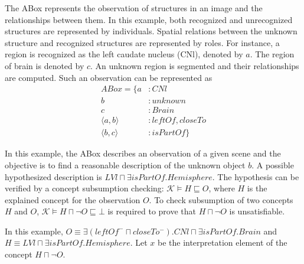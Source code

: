 \documentclass{article}
\begin{document}
The ABox represents the observation of structures in an image and the relationships between them.
In this example, both recognized and unrecognized structures are represented by individuals. Spatial relations between the unknown structure and
recognized structures are represented by roles.
For instance, a region is recognized as the left caudate nucleus (CNl), denoted by $a$.
The region of brain is denoted by $c$. An unknown region is segmented and their relationships are computed.  
Such an observation can be represented as
\begin{align*}
 ABox=\{ a&: CNl \\
	 b&: unknown \\
	 c&: Brain \\
	 \langle a,b\rangle &: leftOf, closeTo \\
	 \langle b,c\rangle &: isPartOf\}
\end{align*}

In this example, the ABox describes an observation of a given scene and the objective is to find a reasonable description of  the unknown object $b$.
A possible hypothesized description is $LVl\sqcap \exists isPartOf.Hemisphere$.
The hypothesis can be verified by a concept subsumption checking: $\mathcal{K} \vDash H\sqsubseteq O$, where $H$ is the explained concept for the observation $O$.
To check subsumption of two concepts $H$ and $O$, $\mathcal{K} \vDash H\sqcap \neg O \sqsubseteq \bot$ is required to prove that $H\sqcap \neg O$ is unsatisfiable.

In this example, $O\equiv \exists (leftOf^-\sqcap closeTo^-). CNl\sqcap \exists isPartOf.Brain$ and $H\equiv LVl\sqcap \exists isPartOf.Hemisphere$.
Let $x$ be the interpretation element of the concept $H\sqcap \neg O$. 
\end{document}
